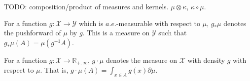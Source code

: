 TODO: composition/product of measures and kernels. $\mu \otimes \kappa$, $\kappa \circ \mu$.

For a function $g : \mathcal X \to \mathcal Y$ which is $a.e.$-measurable with respect to $\mu$, $g_* \mu$ denotes the pushforward of $\mu$ by $g$. This is a measure on $\mathcal Y$ such that $g_* \mu (A) = \mu(g^{-1} A)$.

For a function $g : \mathcal X \to \mathbb{R}_{+,\infty}$, $g \cdot \mu$ denotes the measure on $\mathcal X$ with density $g$ with respect to $\mu$. That is, $g \cdot \mu (A) = \int_{x \in A} g(x) \partial\mu$.
